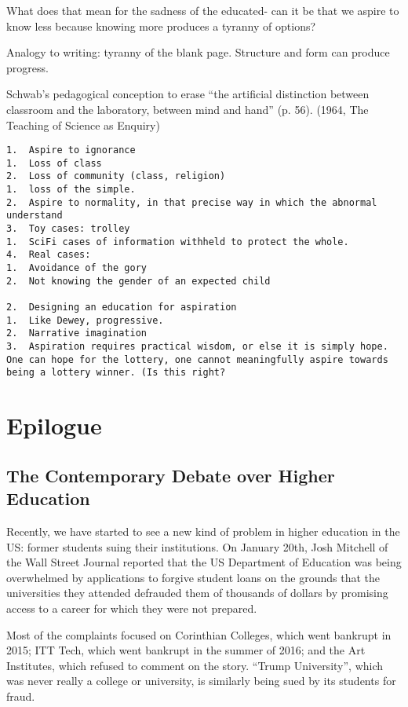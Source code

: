 What does that mean for the sadness of the educated- can it be that we aspire to know less because knowing more produces a tyranny of options?

Analogy to writing: tyranny of the blank page. Structure and form can produce progress.

Schwab's pedagogical conception to erase ``the artificial distinction between classroom and the laboratory, between mind and hand'' (p. 56). (1964, The Teaching of Science as Enquiry)

\begin{verbatim}
1.  Aspire to ignorance
1.  Loss of class
2.  Loss of community (class, religion)
1.  loss of the simple. 
2.  Aspire to normality, in that precise way in which the abnormal understand
3.  Toy cases: trolley
1.  SciFi cases of information withheld to protect the whole.
4.  Real cases: 
1.  Avoidance of the gory
2.  Not knowing the gender of an expected child

2.  Designing an education for aspiration
1.  Like Dewey, progressive. 
2.  Narrative imagination  
3.  Aspiration requires practical wisdom, or else it is simply hope. One can hope for the lottery, one cannot meaningfully aspire towards being a lottery winner. (Is this right?
\end{verbatim}

\part{Epilogue}
\label{epilogue}

\chapter{The Contemporary Debate over Higher Education}
\label{thecontemporarydebateoverhighereducation}

Recently, we have started to see a new kind of problem in higher education in the US: former students suing their institutions. On January 20th, Josh Mitchell of the Wall Street Journal reported that the US Department of Education was being overwhelmed by applications to forgive student loans on the grounds that the universities they attended defrauded them of thousands of dollars by promising access to a career for which they were not prepared. ~\citep{Mitchell:2016vr}

Most of the complaints focused on Corinthian Colleges, which went bankrupt in 2015; ITT Tech, which went bankrupt in the summer of 2016; and the Art Institutes, which refused to comment on the story. ``Trump University'', which was never really a college or university, is similarly being sued by its students for fraud.

